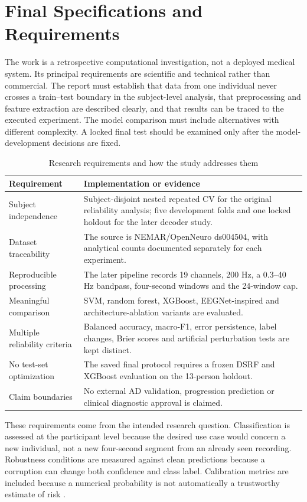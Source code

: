 \section{Final Specifications and Requirements}
The work is a retrospective computational investigation, not a deployed medical system. Its principal requirements are scientific and technical rather than commercial. The report must establish that data from one individual never crosses a train--test boundary in the subject-level analysis, that preprocessing and feature extraction are described clearly, and that results can be traced to the executed experiment. The model comparison must include alternatives with different complexity. A locked final test should be examined only after the model-development decisions are fixed.

\begin{table}[htbp]\centering\small
\caption{Research requirements and how the study addresses them}\label{tab:req}
\begin{tabularx}{\textwidth}{@{}p{}X@{}}\toprule
\textbf{Requirement}&\textbf{Implementation or evidence}\\\midrule
Subject independence&Subject-disjoint nested repeated CV for the original reliability analysis; five development folds and one locked holdout for the later decoder study.\\
Dataset traceability&The source is NEMAR/OpenNeuro ds004504, with analytical counts documented separately for each experiment.\\
Reproducible processing&The later pipeline records 19 channels, 200 Hz, a 0.3--40 Hz bandpass, four-second windows and the 24-window cap.\\
Meaningful comparison&SVM, random forest, XGBoost, EEGNet-inspired and architecture-ablation variants are evaluated.\\
Multiple reliability criteria&Balanced accuracy, macro-F1, error persistence, label changes, Brier scores and artificial perturbation tests are kept distinct.\\
No test-set optimization&The saved final protocol requires a frozen DSRF and XGBoost evaluation on the 13-person holdout.\\
Claim boundaries&No external AD validation, progression prediction or clinical diagnostic approval is claimed.\\
\bottomrule\end{tabularx}\end{table}

These requirements come from the intended research question. Classification is assessed at the participant level because the desired use case would concern a new individual, not a new four-second segment from an already seen recording. Robustness conditions are measured against clean predictions because a corruption can change both confidence and class label. Calibration metrics are included because a numerical probability is not automatically a trustworthy estimate of risk \cite{guo2017calibration}.

